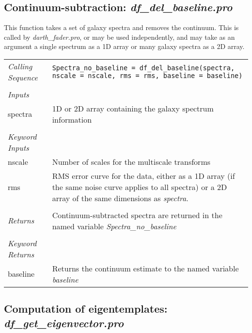\documentclass[a4paper]{article}
\begin{document}
\subsection{Continuum-subtraction: {\em df\_del\_baseline.pro}}

This function takes a set of galaxy spectra and removes the continuum. This is called by {\em darth\_fader.pro}, or may be used independently, and may take as an argument a single spectrum as a 1D array or many galaxy spectra as a 2D array.

\noindent\begin{tabularx}{\textwidth}{LI}
{\em Calling Sequence} & \texttt{Spectra\_no\_baseline = df\_del\_baseline(spectra, nscale = nscale, rms = rms, baseline = baseline)}\\
 & \\
{\em Inputs} & \\
spectra & 1D or 2D array containing the galaxy spectrum information\\
 & \\
{\em Keyword Inputs} & \\
nscale & Number of scales for the multiscale transforms \\
rms & RMS error curve for the data, either as a 1D array (if the same noise curve applies to all spectra) or a 2D array of the same dimensions as {\em spectra}. \\
 & \\
{\em Returns} & Continuum-subtracted spectra are returned in the named variable {\em Spectra\_no\_baseline} \\
 & \\
{\em Keyword Returns} & \\
baseline & Returns the continuum estimate to the named variable {\em baseline}
\end{tabularx}

\subsection{Computation of eigentemplates: {\em df\_get\_eigenvector.pro}}
\end{document}
